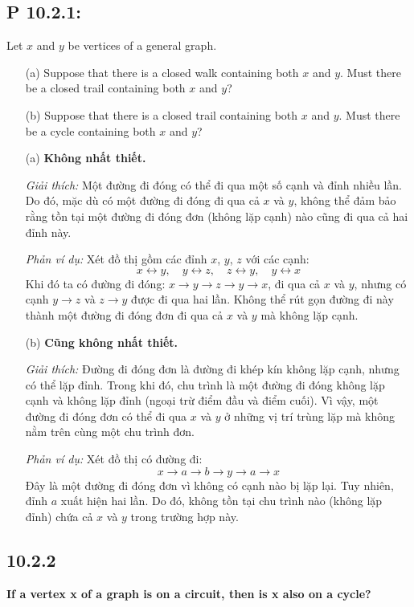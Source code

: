 \documentclass{article}
\begin{document}
	\subsection*{P 10.2.1:}
	Let $x$ and $y$ be vertices of a general graph.
	\begin{itemize}
		\item[(a)] Suppose that there is a closed walk containing both $x$ and $y$. Must there be a closed trail containing both $x$ and $y$?
		\item[(b)] Suppose that there is a closed trail containing both $x$ and $y$. Must there be a cycle containing both $x$ and $y$?
	\end{itemize}
	\begin{itemize}[leftmargin=1.5em]
		\item[(a)] \textbf{Không nhất thiết.}
		
		\textit{Giải thích:} Một đường đi đóng có thể đi qua một số cạnh và đỉnh nhiều lần. Do đó, mặc dù có một đường đi đóng đi qua cả $x$ và $y$, không thể đảm bảo rằng tồn tại một đường đi đóng đơn (không lặp cạnh) nào cũng đi qua cả hai đỉnh này.
		
		\textit{Phản ví dụ:} Xét đồ thị gồm các đỉnh $x$, $y$, $z$ với các cạnh:
		\[
		x \leftrightarrow y,\quad y \leftrightarrow z,\quad z \leftrightarrow y,\quad y \leftrightarrow x
		\]
		Khi đó ta có đường đi đóng: $x \to y \to z \to y \to x$, đi qua cả $x$ và $y$, nhưng có cạnh $y \to z$ và $z \to y$ được đi qua hai lần. Không thể rút gọn đường đi này thành một đường đi đóng đơn đi qua cả $x$ và $y$ mà không lặp cạnh.
		
		\item[(b)] \textbf{Cũng không nhất thiết.}
		
		\textit{Giải thích:} Đường đi đóng đơn là đường đi khép kín không lặp cạnh, nhưng có thể lặp đỉnh. Trong khi đó, chu trình là một đường đi đóng không lặp cạnh và không lặp đỉnh (ngoại trừ điểm đầu và điểm cuối). Vì vậy, một đường đi đóng đơn có thể đi qua $x$ và $y$ ở những vị trí trùng lặp mà không nằm trên cùng một chu trình đơn.
		
		\textit{Phản ví dụ:} Xét đồ thị có đường đi:
		\[
		x \to a \to b \to y \to a \to x
		\]
		Đây là một đường đi đóng đơn vì không có cạnh nào bị lặp lại. Tuy nhiên, đỉnh $a$ xuất hiện hai lần. Do đó, không tồn tại chu trình nào (không lặp đỉnh) chứa cả $x$ và $y$ trong trường hợp này.
		
	\end{itemize}
	
	\subsection*{10.2.2}
	\textbf{If a vertex x of a graph is on a circuit, then is x also on a cycle?}
	
\end{document}
